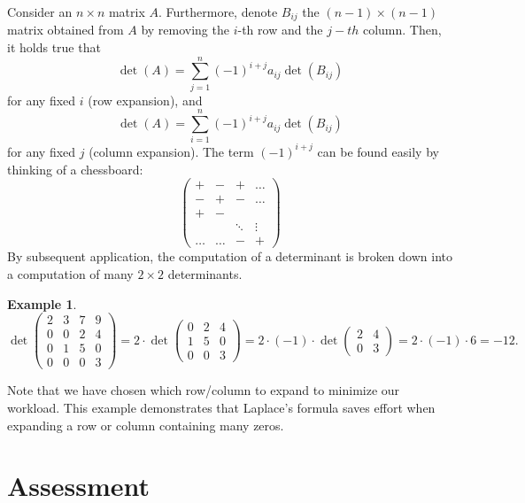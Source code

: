 \documentclass[a4paper,11pt]{article}
\newtheorem{example}{Example}
\begin{document}
Consider an $n\times n$ matrix $A$. Furthermore, denote $B_{ij}$ the $(n-1)\times(n-1)$ matrix obtained from $A$ by removing the $i$-th row and the $j-th$ column. Then, it holds true that
\begin{equation}
\det(A) = \sum_{j=1}^{n} (-1)^{i+j} a_{ij} \det(B_{ij})
\end{equation}
for any fixed $i$ (row expansion), and
\begin{equation}
\det(A) = \sum_{i=1}^{n} (-1)^{i+j} a_{ij} \det(B_{ij}) 
\end{equation}
for any fixed $ j$ (column expansion).
The term $(-1)^{i+j}$ can be found easily by thinking of a chessboard: 
\begin{equation*}\begin{pmatrix}
+ & - & + & \hdots  \\
- & + & - & \hdots \\
+& - & &  \\
& &\ddots  & \vdots \\
\hdots & \hdots &- &+ 
\end{pmatrix}
\end{equation*}
By subsequent application, the computation of a determinant is broken down into a computation of many $2\times 2$ determinants. 
\begin{example}
\begin{equation*}
\det\begin{pmatrix}
2 & 3 & 7 & 9 \\
0 & 0 & 2 & 4 \\
0 & 1 & 5 & 0 \\
0 & 0 & 0 & 3 
\end{pmatrix}
= 2\cdot \det\begin{pmatrix}
0 & 2 & 4 \\ 1 & 5 & 0 \\0 & 0 & 3
\end{pmatrix} = 2\cdot (-1) \cdot \det\begin{pmatrix}
2 & 4 \\ 0 & 3
\end{pmatrix}=2\cdot (-1) \cdot6=-12.
\end{equation*}
\end{example}
Note that we have chosen which row/column to expand to minimize our workload. This example demonstrates that Laplace's formula saves effort when expanding a row or column containing many zeros.

\section*{Assessment}
\end{document}
